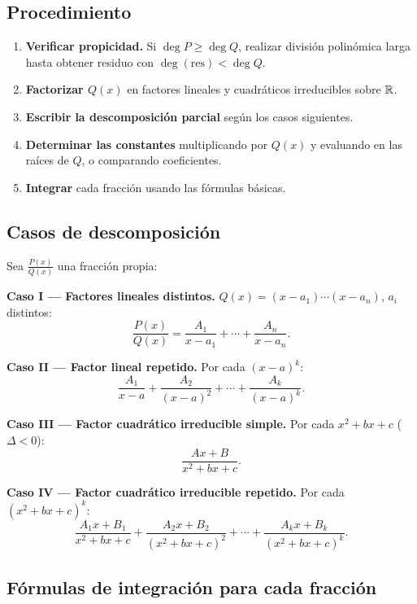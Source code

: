 \subsection{Procedimiento}

\begin{pasos}
\begin{enumerate}
    \item \textbf{Verificar propicidad.} Si $\deg P \geq \deg Q$, realizar
    división polinómica larga hasta obtener residuo con $\deg(\text{res})
    < \deg Q$.
    \item \textbf{Factorizar $Q(x)$} en factores lineales y cuadráticos
    irreducibles sobre ${\mathbb R}$.
    \item \textbf{Escribir la descomposición parcial} según los casos
    siguientes.
    \item \textbf{Determinar las constantes} multiplicando por $Q(x)$ y
    evaluando en las raíces de $Q$, o comparando coeficientes.
    \item \textbf{Integrar} cada fracción usando las fórmulas básicas.
\end{enumerate}
\end{pasos}

\subsection{Casos de descomposición}

\begin{definition}
Sea $\frac{P(x)}{Q(x)}$ una fracción propia:

\textbf{Caso I --- Factores lineales distintos.}
$Q(x)=(x-a_1)\cdots(x-a_n)$, $a_i$ distintos:
\[
\frac{P(x)}{Q(x)}=\frac{A_1}{x-a_1}+\cdots+\frac{A_n}{x-a_n}.
\]

\textbf{Caso II --- Factor lineal repetido.} Por cada $(x-a)^k$:
\[
\frac{A_1}{x-a}+\frac{A_2}{(x-a)^2}+\cdots+\frac{A_k}{(x-a)^k}.
\]

\textbf{Caso III --- Factor cuadrático irreducible simple.}
Por cada $x^2+bx+c$ ($\Delta<0$):
\[
\frac{Ax+B}{x^2+bx+c}.
\]

\textbf{Caso IV --- Factor cuadrático irreducible repetido.}
Por cada $(x^2+bx+c)^k$:
\[
\frac{A_1 x+B_1}{x^2+bx+c}+\frac{A_2 x+B_2}{(x^2+bx+c)^2}+\cdots+
\frac{A_k x+B_k}{(x^2+bx+c)^k}.
\]
\end{definition}

\subsection{Fórmulas de integración para cada fracción}

